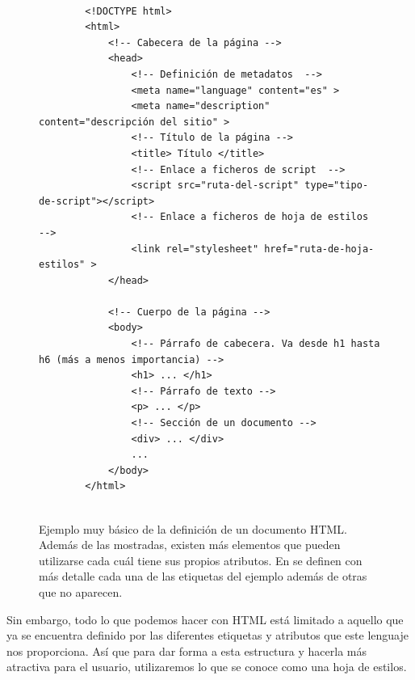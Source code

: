\documentclass[../main.tex]{subfiles}
\begin{document}
    
    \begin{figure}[!h]
        \centering
        \begin{verbatim}
        
        <!DOCTYPE html>
        <html>
            <!-- Cabecera de la página -->
            <head>
                <!-- Definición de metadatos  -->
                <meta name="language" content="es" > 
                <meta name="description" content="descripción del sitio" > 
                <!-- Título de la página -->
                <title> Título </title>
                <!-- Enlace a ficheros de script  -->
                <script src="ruta-del-script" type="tipo-de-script"></script>
                <!-- Enlace a ficheros de hoja de estilos  -->
                <link rel="stylesheet" href="ruta-de-hoja-estilos" >
            </head>
            
            <!-- Cuerpo de la página -->
            <body>
                <!-- Párrafo de cabecera. Va desde h1 hasta h6 (más a menos importancia) -->
                <h1> ... </h1>
                <!-- Párrafo de texto -->
                <p> ... </p>
                <!-- Sección de un documento -->
                <div> ... </div>
                ...
            </body>
        </html>
        
        \end{verbatim}
        \caption{Ejemplo muy básico de la definición de un documento HTML. Además de las mostradas, existen más elementos que pueden utilizarse cada cuál tiene sus propios atributos. En \cite{etiquetasbasicashtml} se definen con más detalle cada una de las etiquetas del ejemplo además de otras que no aparecen.}
        \label{fig:estructura_documento_html_I}
    \end{figure}
    Sin embargo, todo lo que podemos hacer con HTML está limitado a aquello que ya se encuentra definido por las diferentes etiquetas y atributos que este lenguaje nos proporciona. Así que para dar forma a esta estructura y hacerla más atractiva para el usuario, utilizaremos lo que se conoce como una hoja de estilos.

    
\end{document}
